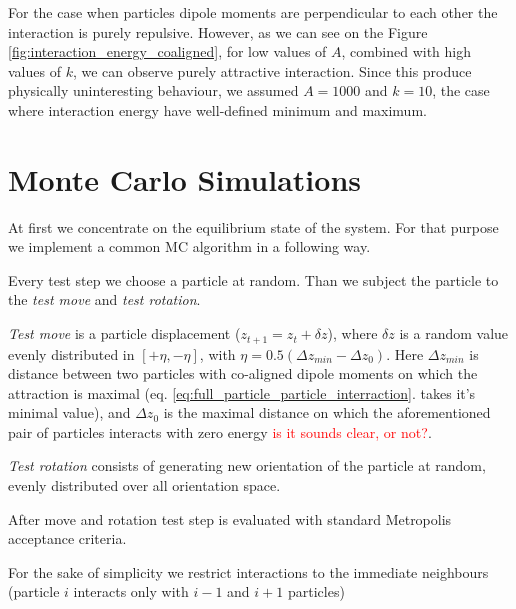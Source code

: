 \documentclass[12pt,a4paper]{article}
\begin{document}
For the case when particles dipole moments are perpendicular to each other the interaction is purely repulsive. However, as we can see on the Figure \ref{fig:interaction_energy_coaligned}, for low values of $A$, combined with high values of $k$, we can observe purely attractive interaction. Since this produce physically uninteresting behaviour, we assumed $A = 1000$ and $k = 10$, the case where interaction energy have well-defined minimum and maximum.


\section{Monte Carlo Simulations}

At first we concentrate on the equilibrium state of the system. For that purpose we implement a common MC algorithm in a following way.

Every test step we choose a particle at random. Than we subject the particle to the \emph{test move} and \emph{test rotation}.

\emph{Test move} is a particle displacement ($z_{t+1} = z_t + \delta z$), where $\delta z$ is a random value evenly distributed in $[+\eta, -\eta]$, with $\eta = 0.5 (\Delta z_{min} - \Delta z_0)$. Here $\Delta z_{min}$ is distance between two particles with co-aligned dipole moments on which the attraction is maximal (eq. \ref{eq:full_particle_particle_interraction}. takes it's minimal value), and $\Delta z_0$ is the maximal distance on which the aforementioned pair of particles interacts with zero energy \textcolor{red}{is it sounds clear, or not?}.

\emph{Test rotation} consists of generating new orientation of the particle at random, evenly distributed over all orientation space.

After move and rotation test step is evaluated with standard Metropolis acceptance criteria.

For the sake of simplicity we restrict interactions to the immediate neighbours (particle $i$ interacts only with $i-1$ and $i+1$ particles) 
\end{document}
